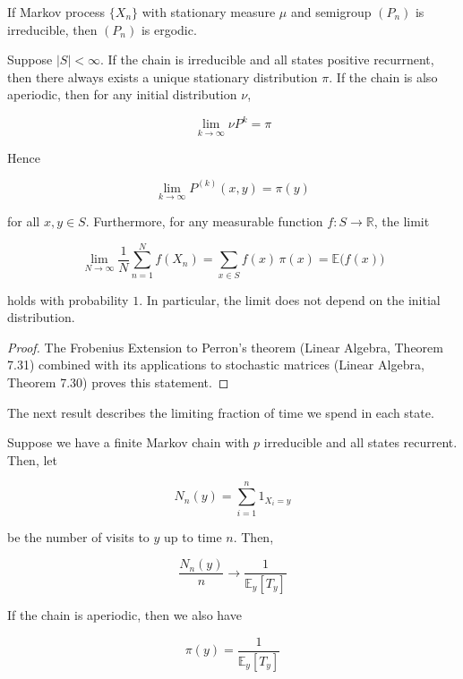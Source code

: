 \documentclass{article}
\begin{document}
    \begin{theorem}
      If Markov process $\{X_n\}$ with stationary measure $\mu$ and semigroup $(P_n)$ is irreducible, then $(P_n)$ is ergodic. 
    \end{theorem}

    \begin{theorem}
      Suppose $|S| < \infty$. If the chain is irreducible and all states positive recurrnent, then there always exists a unique stationary distribution $\pi$. If the chain is also aperiodic, then for any initial distribution $\nu$, 

        \[\lim_{k \rightarrow \infty} \nu P^k = \pi \]

      Hence

        \[\lim_{k \rightarrow \infty} P^{(k)}(x, y) = \pi(y)\]

      for all $x, y \in S$. Furthermore, for any measurable function $f: S \longrightarrow \mathbb{R}$, the limit 

        \[\lim_{N \rightarrow \infty} \frac{1}{N} \sum_{n=1}^N f(X_n) = \sum_{x \in S} f(x)\, \pi(x) = \mathbb{E} \big( f(x) \big)\]

      holds with probability $1$. In particular, the limit does not depend on the initial distribution. 
    \end{theorem}
    \begin{proof}
      The Frobenius Extension to Perron's theorem (Linear Algebra, Theorem 7.31) combined with its applications to stochastic matrices (Linear Algebra, Theorem 7.30) proves this statement. 
    \end{proof}

    The next result describes the limiting fraction of time we spend in each state. 

    \begin{theorem}
      Suppose we have a finite Markov chain with $p$ irreducible and all states recurrent. Then, let 

        \[N_n (y) = \sum_{i=1}^n 1_{X_i = y}\]

      be the number of visits to $y$ up to time $n$. Then, 

        \[\frac{N_n (y)}{n} \rightarrow \frac{1}{\mathbb{E}_y [T_y]}\]

      If the chain is aperiodic, then we also have 

        \[\pi(y) = \frac{1}{\mathbb{E}_y [T_y]}\]
    \end{theorem}
\end{document}
